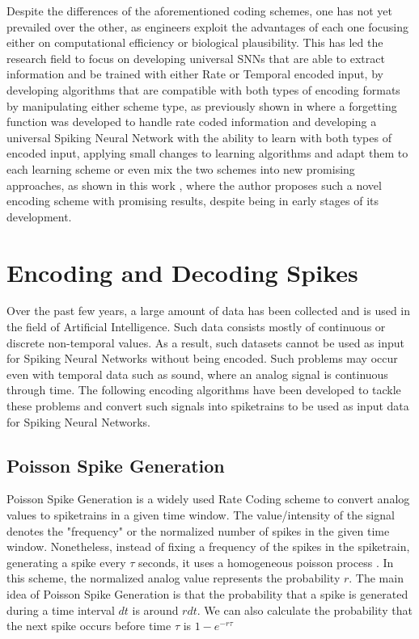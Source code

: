 \documentclass[12pt]{report}
\begin{document}
\medskip
Despite the differences of the aforementioned coding schemes, one has not yet prevailed over the other, as engineers exploit the advantages of each one focusing either on computational efficiency or biological plausibility. This has led the research field to focus on developing universal SNNs that are able to extract information and be trained with either Rate or Temporal encoded input, by developing algorithms that are compatible with both types of encoding formats by manipulating either scheme type, as previously shown in \cite{Lobov2020} where a forgetting function was developed to handle rate coded information and developing a universal Spiking Neural Network with the ability to learn with both types of encoded input, applying small changes to learning algorithms and adapt them to each learning scheme \cite{Yin201} or even mix the two schemes into new promising approaches, as shown in this work \cite{Kiselev2016}, where the author proposes such a novel encoding scheme with promising results, despite being in early stages of its development.

\section{Encoding and Decoding Spikes}

Over the past few years, a large amount of data has been collected and is used in the field of Artificial Intelligence. Such data consists mostly of continuous or discrete non-temporal values. As a result, such datasets cannot be used as input for Spiking Neural Networks without being encoded. Such problems may occur even with temporal data such as sound, where an analog signal is continuous through time. The following encoding algorithms have been developed to tackle these problems and convert such signals into spiketrains to be used as input data for Spiking Neural Networks.

\subsection{Poisson Spike Generation}

Poisson Spike Generation is a widely used Rate Coding scheme to convert analog values to spiketrains in a given time window. The value/intensity of the signal denotes the "frequency" or the normalized number of spikes in the given time window. Nonetheless, instead of fixing a frequency of the spikes in the spiketrain, generating a spike every \(\tau\) seconds, it uses a homogeneous poisson process \cite{Heeger2000}. In this scheme, the normalized analog value represents the probability \(r\). The main idea of Poisson Spike Generation is that the probability that a spike is generated during a time interval \(dt\) is around \(rdt\). We can also calculate the probability that the next spike occurs before time \(\tau\) is \(1-e^{-r\tau}\)
\end{document}
